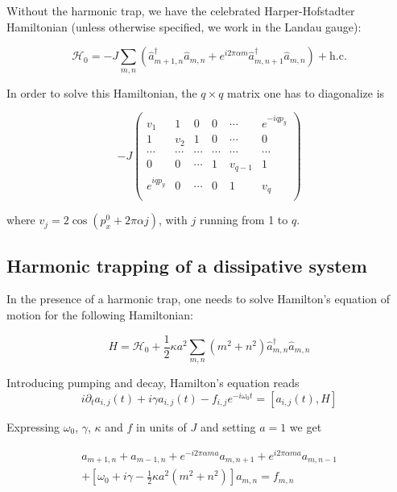 \documentclass[twocolumn, 10pt, aps, superscriptaddress, floatfix, showpacs, prb, citeautoscript]{revtex4-1}
\begin{document}
Without the harmonic trap, we have the celebrated Harper-Hofstadter
Hamiltonian (unless otherwise specified, we work in the Landau gauge):

\begin{equation}\label{eq:gigi}
  \mathcal{H}_0=-J\sum_{m,n}(\hat{a}_{m+1,n}^{\dagger}\hat{a}_{m,n}+e^{i2\pi\alpha m}\hat{a}_{m,n+1}^{\dagger}\hat{a}_{m,n}) + \text{h.c.}
\end{equation}

In order to solve this Hamiltonian, the $q \times q$ matrix one has to diagonalize is

\begin{equation}
-J\begin{pmatrix}
    v_1 & 1 & 0 & 0 & \cdots & e^{-iqp_y}\\
    1 & v_2 & 1 & 0 & \cdots & 0\\
    \cdots & \cdots & \cdots & \cdots & \cdots & \cdots\\
    0 & 0 & \cdots & 1 & v_{q-1} & 1\\
    e^{i q p_y} & 0 & \cdots & 0 & 1 & v_q\\
  \end{pmatrix}
\end{equation}

where $v_j = 2\cos(p_x^0 + 2\pi \alpha j)$, with $j$ running from 1 to $q$.

\subsection{Harmonic trapping of a dissipative system}
\label{sec:hh_trap}

In the presence of a harmonic trap, one needs to solve Hamilton's
equation of motion for the following Hamiltonian:

\begin{equation}
H=\mathcal{H}_0+\frac{1}{2}\kappa
a^{2}\sum_{m,n}(m^{2}+n^{2})\hat{a}_{m,n}^{\dagger}\hat{a}_{m,n}
\end{equation}

Introducing pumping and decay, Hamilton's equation reads
\begin{equation}
i\partial_{t}a_{i,j}(t)+i\gamma
a_{i,j}(t)-f_{i,j}e^{-i\omega_{0}t}=\left[a_{i,j}(t),H\right]
\end{equation}

Expressing $\omega_{0}$, $\gamma$, $\kappa$ and $f$ in units of $J$
and setting $a=1$ we get

\begin{multline}
a_{m+1,n}+a_{m-1,n}+e^{-i2\pi\alpha ma}a_{m,n+1}+e^{i2\pi\alpha
ma}a_{m,n-1}\\
+\left[\omega_{0}+i\gamma-\frac{1}{2}\kappa
a^{2}(m^{2}+n^{2})\right]a_{m,n}=f_{m,n}
\end{multline}
\end{document}
